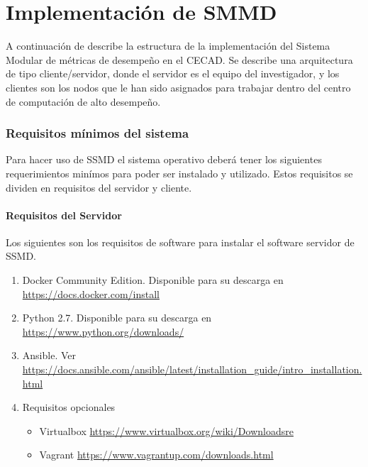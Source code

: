 \chapter{Implementación de SMMD}

A continuación de describe la estructura de la implementación del Sistema Modular de métricas de desempeño en el CECAD.
Se describe una arquitectura de tipo cliente/servidor, donde el servidor es el equipo del investigador, y los clientes son los nodos
que le han sido asignados para trabajar dentro del centro de computación de alto desempeño.


\subsection{Requisitos mínimos del sistema}
Para hacer uso de SSMD el sistema operativo deberá tener los siguientes requerimientos minímos para poder ser instalado y utilizado.
Estos requisitos se dividen en requisitos del servidor y cliente.

\subsubsection{Requisitos del Servidor}
Los siguientes son los requisitos de software para instalar el software servidor de SSMD.

\begin{enumerate}
	\item Docker Community Edition. Disponible para su descarga en \url{https://docs.docker.com/install}
	\item Python 2.7. Disponible para su descarga en \url{https://www.python.org/downloads/}
	\item Ansible. Ver \url{https://docs.ansible.com/ansible/latest/installation_guide/intro_installation.html}
	\item Requisitos opcionales 
	\begin{itemize}
		\item Virtualbox \url{https://www.virtualbox.org/wiki/Downloadsre}
		\item Vagrant \url{https://www.vagrantup.com/downloads.html}
	\end{itemize}
\end{enumerate}

